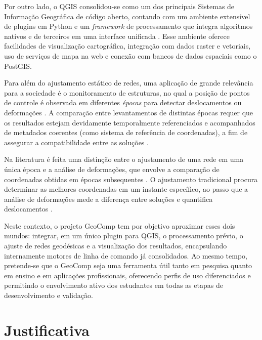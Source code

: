 \documentclass[
        12pt,                           %
        openright,                      %
        oneside,
        a4paper,                        %
        chapter=TITLE,         %
        section=TITLE,         %
        subsection=Title,      %
        english,                        %
        portugues,                      %
        ]{abntex2}
\newcommand{\removechapterpagebreak}{%
  \renewcommand{\cleardoublepage}{}%
  \renewcommand{\clearpage}{}%
  \let\oldchapter\chapter%
  \renewcommand{\chapter}{%
    \ifdim\pagetotal>0pt%
      \vspace{2\baselineskip}%
    \fi%
    \oldchapter%
  }%
}
\begin{document}
Por outro lado, o QGIS consolidou-se como um dos principais Sistemas de Informação Geográfica de código aberto, contando com um ambiente extensível de plugins em Python e um \textit{framework} de processamento que integra algoritmos nativos e de terceiros em uma interface unificada \cite{qgis_processing_manual}. Esse ambiente oferece facilidades de visualização cartográfica, integração com dados raster e vetoriais, uso de serviços de mapa na web e conexão com bancos de dados espaciais como o PostGIS.

Para além do ajustamento estático de redes, uma aplicação de grande relevância para a sociedade é o monitoramento de estruturas, no qual a posição de pontos de controle é observada em diferentes \emph{épocas} para detectar deslocamentos ou deformações \cite{Granemann2005_SaltoCaxias,wander_thesis,Kuang1996}. A comparação entre levantamentos de distintas épocas requer que os resultados estejam devidamente temporalmente referenciados e acompanhados de metadados coerentes (como sistema de referência de coordenadas), a fim de assegurar a compatibilidade entre as soluções \cite{Kuang1996}.

Na literatura é feita uma distinção entre o ajustamento de uma rede em uma única época e a análise de deformações, que envolve a comparação de coordenadas obtidas em épocas subsequentes \cite{Kuang1996}. O ajustamento tradicional procura determinar as melhores coordenadas em um instante específico, ao passo que a análise de deformações mede a diferença entre soluções e quantifica deslocamentos \cite{Kuang1996}.

Neste contexto, o projeto GeoComp tem por objetivo aproximar esses dois mundos: integrar, em um único plugin para QGIS, o processamento prévio, o ajuste de redes geodésicas e a visualização dos resultados, encapsulando internamente motores de linha de comando já consolidados. Ao mesmo tempo, pretende-se que o GeoComp seja uma ferramenta útil tanto em pesquisa quanto em ensino e em aplicações profissionais, oferecendo perfis de uso diferenciados e permitindo o envolvimento ativo dos estudantes em todas as etapas de desenvolvimento e validação.

\removechapterpagebreak

\chapter{Justificativa}
\end{document}
